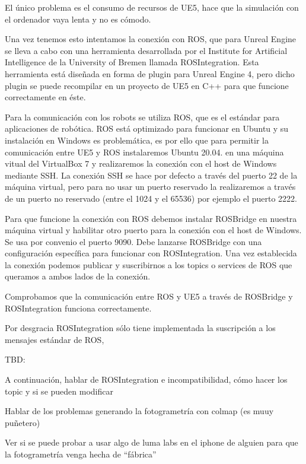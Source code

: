 \documentclass[a4paper, 12pt, spanish, twoside]{article}
\begin{document}
El único problema es el consumo de recursos de UE5, hace que la simulación con el ordenador vaya lenta y no es cómodo.

Una vez tenemos esto intentamos la conexión con ROS, que para Unreal Engine se lleva a cabo con una herramienta desarrollada por el Institute for Artificial Intelligence de la University of Bremen llamada ROSIntegration. Esta herramienta está diseñada en forma de plugin para Unreal Engine 4, pero dicho plugin se puede recompilar en un proyecto de UE5 en C++ para que funcione correctamente en éste.

Para la comunicación con los robots se utiliza ROS, que es el estándar para aplicaciones de robótica. ROS está optimizado para funcionar en Ubuntu y su instalación en Windows es problemática, es por ello que para permitir la comunicación entre UE5 y ROS instalaremos Ubuntu 20.04. en una máquina vitual del VirtualBox 7 y realizaremos la conexión con el host de Windows mediante SSH. La conexión SSH se hace por defecto a través del puerto 22 de la máquina virtual, pero para no usar un puerto reservado la realizaremos a través de un puerto no reservado (entre el 1024 y el 65536) por ejemplo el puerto 2222.

Para que funcione la conexión con ROS debemos instalar ROSBridge en nuestra máquina virtual y habilitar otro puerto para la conexión con el host de Windows. Se usa por convenio el puerto 9090. Debe lanzarse ROSBridge con una configuración específica para funcionar con ROSIntegration. Una vez establecida la conexión podemos publicar y suscribirnos a los topics o services de ROS que queramos a ambos lados de la conexión.

Comprobamos que la comunicación entre ROS y UE5 a través de ROSBridge y ROSIntegration funciona correctamente.

Por desgracia ROSIntegration sólo tiene implementada la suscripción a los mensajes estándar de ROS,

TBD:

A continuación, hablar de ROSIntegration e incompatibilidad, cómo hacer los topic y si se pueden modificar

Hablar de los problemas generando la fotogrametría con colmap (es muuy puñetero)

Ver si se puede probar a usar algo de luma labs en el iphone de alguien para que la fotogrametría venga hecha de “fábrica”

\clearpage
\end{document}
